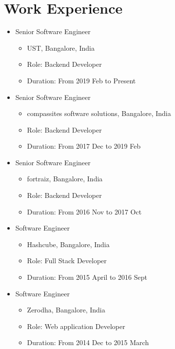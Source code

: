 \documentclass[11pt,a4paper]{moderncv}
\begin{document}
\section{Work Experience}
    \begin{itemize}
        \item Senior Software Engineer
        \begin{itemize}
            \item UST, Bangalore, India
	    \item Role: Backend Developer   
            \item Duration: From 2019 Feb to Present 
        \end{itemize}
    \end{itemize}
    \begin{itemize}
        \item Senior Software Engineer
        \begin{itemize}
            \item compassites software solutions, Bangalore, India
            \item Role: Backend Developer
            \item Duration: From 2017 Dec to 2019 Feb 
        \end{itemize}
    \end{itemize}
    \begin{itemize}
        \item Senior Software Engineer
        \begin{itemize}
            \item fortraiz, Bangalore, India
            \item Role: Backend Developer
            \item Duration: From 2016 Nov to 2017 Oct 
        \end{itemize}
    \end{itemize}
    \begin{itemize}
        \item Software Engineer
        \begin{itemize}
            \item Hashcube, Bangalore, India
            \item Role: Full Stack Developer  
            \item Duration: From 2015 April to 2016 Sept
        \end{itemize}
    \end{itemize}
\pagebreak
    \begin{itemize}
        \item Software Engineer
        \begin{itemize}
            \item Zerodha, Bangalore, India
            \item Role: Web application Developer
            \item Duration: From 2014 Dec to 2015 March 
        \end{itemize}
    \end{itemize}
\end{document}
